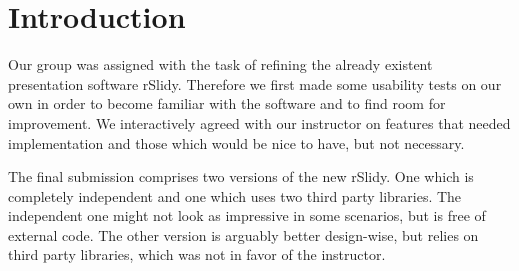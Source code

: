 %
%
% 
% 
% 


\chapter{Introduction}

\label{chap:Intro}

Our group was assigned with the task of refining the already existent presentation software rSlidy. Therefore we first made some usability tests on our own in order to become familiar with the software and to find room for improvement. We interactively agreed with our instructor on features that needed implementation and those which would be nice to have, but not necessary.

The final submission comprises two versions of the new rSlidy. One which is completely independent and one which uses two third party libraries. The independent one might not look as impressive in some scenarios, but is free of external code. The other version is arguably better design-wise, but relies on third party libraries, which was not in favor of the instructor. 

